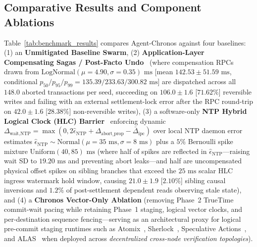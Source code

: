 \documentclass[conference,10pt]{IEEEtran}
\begin{document}
\subsection{Comparative Results and Component Ablations}
Table~\ref{tab:benchmark_results} compares Agent-Chronos against four baselines: (1) an \textbf{Unmitigated Baseline Swarm}, (2) \textbf{Application-Layer Compensating Sagas / Post-Facto Undo}~\cite{garcia1987sagas, patil2024goex, chang2025sagallm} (where compensation RPCs drawn from $\text{LogNormal}(\mu=4.90,\sigma=0.35)\text{ ms}$ [mean $142.53 \pm 51.59\text{ ms}$, conditional $p_{50}/p_{95}/p_{99} = 135.39/233.63/300.82\text{ ms}$] are dispatched across all $148.0$ aborted transactions per seed, succeeding on $106.0 \pm 1.6$ [$71.62\%$] reversible writes and failing with an external settlement-lock error after the RPC round-trip on $42.0 \pm 1.6$ [$28.38\%$] non-reversible writes), (3) a software-only \textbf{NTP Hybrid Logical Clock (HLC) Barrier}~\cite{kulkarni2014hlc} enforcing dynamic $\Delta_{\text{wait,NTP}} = \max(0, 2\hat{\epsilon}_{\text{NTP}} + \Delta_{\text{abort\_prop}} - \bar{\Delta}_{\text{ipc}})$ over local NTP daemon error estimates $\hat{\epsilon}_{\text{NTP}} \sim \text{Normal}(\mu = 35\text{ ms}, \sigma = 8\text{ ms})$ plus a $5\%$ Bernoulli spike mixture $\text{Uniform}(40, 85)\text{ ms}$ (where half of spikes are reflected in $\hat{\epsilon}_{\text{NTP}}$---raising wait SD to $19.20\text{ ms}$ and preventing abort leaks---and half are uncompensated physical offset spikes on sibling branches that exceed the $25\text{ ms}$ scalar HLC ingress watermark hold window, causing $21.0 \pm 1.9$ [$2.10\%$] sibling causal inversions and $1.2\%$ of post-settlement dependent reads observing stale state), and (4) a \textbf{Chronos Vector-Only Ablation} (removing Phase~2 TrueTime commit-wait pacing while retaining Phase~1 staging, logical vector clocks, and per-destination sequence fencing---serving as an architectural proxy for logical pre-commit staging runtimes such as Atomix~\cite{mohammadi2026atomix}, Sherlock~\cite{ro2025sherlock}, Speculative Actions~\cite{ye2025speculative}, and ALAS~\cite{geng2025alas} when deployed across \emph{decentralized cross-node verification topologies}).
\end{document}
